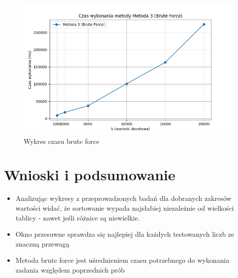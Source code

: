 \documentclass[12pt,twoside]{article}
\begin{document}
\begin{figure}[!h]
    \centering
    \includegraphics[width=1\linewidth]{wykres_3.png}
    \caption{Wykres czasu brute force}
    \label{fig:enter-label}
\end{figure}
\clearpage

\section{Wnioski i podsumowanie}
\begin{itemize}
    \item Analizując wykresy z przeprowadzonych badań dla dobranych zakresów wartości widać, że sortowanie wypada najsłabiej niezależnie od wielkości tablicy - nawet jeśli różnice są niewielkie.
    \item Okno przesuwne sprawdza się najlepiej dla każdych testowanych liczb ze znaczną przewagą
    \item Metoda brute force jest uśrednieniem czasu potrzebnego do wykonania zadania względem poprzednich prób
\end{itemize}
\end{document}
